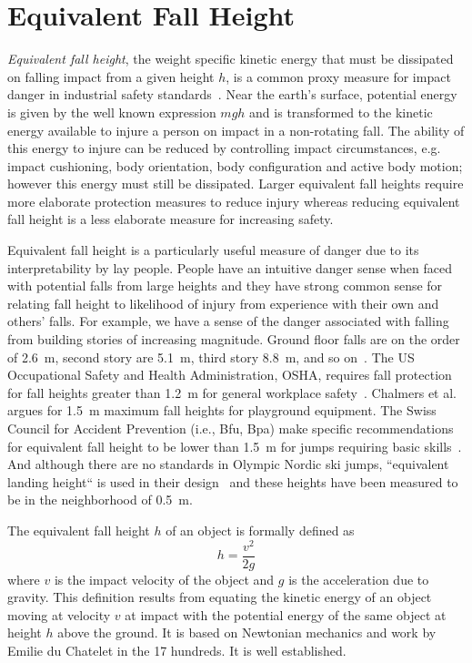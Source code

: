 \documentclass[smallextended]{svjour3}       %
\begin{document}
\section{Equivalent Fall Height}
\label{sec:efh}
%
\emph{Equivalent fall height}, the weight specific kinetic energy that must be dissipated on falling 
impact from a given height $h$, is a common proxy measure for impact danger in
industrial safety standards~\cite{Hubbard2012}.  Near the earth's surface, potential
energy is given by the well known expression $mgh$ and is transformed to the kinetic
energy available to injure a person on impact in a non-rotating fall. The ability of this
energy to injure can be reduced by controlling impact circumstances, e.g.
impact cushioning, body orientation, body configuration and active body motion;
however this energy must still be dissipated. Larger equivalent fall heights
require more elaborate protection measures to reduce injury whereas reducing
equivalent fall height is a less elaborate measure for increasing safety.

Equivalent fall height is a particularly useful measure of danger due to its
interpretability by lay people. People have an intuitive danger sense when
faced with potential falls from large heights and they have strong common sense
for relating fall height to likelihood of injury from experience with their
own and others' falls. For example, we have a sense of the danger associated
with falling from building stories of increasing magnitude. Ground floor falls
are on the order of 2.6~\si{\meter}, second story are 5.1~\si{\meter}, third
story 8.8~\si{\meter}, and so on~\cite{Vish2005}. The US Occupational Safety
and Health Administration, OSHA, requires fall protection for fall heights
greater than 1.2~\si{\meter} for general workplace safety~\cite{OSHA2021}.
Chalmers et al.~\cite{Chalmers1996} argues for 1.5~\si{\meter} maximum fall
heights for playground equipment. The Swiss Council for Accident Prevention (i.e., Bfu, Bpa)
make specific recommendations for equivalent fall height to be lower than
1.5~\si{\meter} for jumps requiring basic skills~\cite{Heer2019}. And although
there are no standards in Olympic Nordic ski jumps, ``equivalent landing
height`` is used in their design~\cite{Gasser2018} and these heights have been
measured to be in the neighborhood of 0.5~\si{\meter}.

The equivalent fall height $h$ of an object is formally defined as
%
\begin{equation} h = \frac{v^2}{2g} \label{eq:efh_general} \end{equation}
%
where $v$ is the impact velocity of the object and $g$ is the acceleration due
to gravity. This definition results from equating the kinetic energy of an
object moving at velocity $v$ at impact with the potential energy of the same
object at height $h$ above the ground. It is based on Newtonian mechanics and work by Emilie du Chatelet in the 17 hundreds. It is well established.
\end{document}
